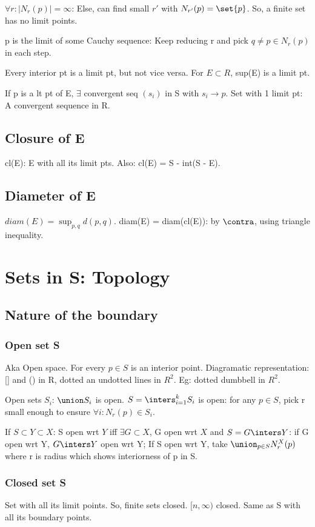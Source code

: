 \documentclass[oneside, article]{memoir}
\begin{document}
$\forall r : |N_{r}(p)| = \infty$: Else, can find small $r'$ with $N_{r'}(p) = \set{p}$. So, a finite set has no limit points.

p is the limit of some Cauchy sequence: Keep reducing r and pick $q \neq p \in N_{r}(p)$ in each step.

Every interior pt is a limit pt, but not vice versa. For $E\subset R$, sup(E) is a limit pt.

If p is a lt pt of E, $\exists$ convergent seq $(s_{i})$ in S with $s_{i} \to p$. Set with 1 limit pt: A convergent sequence in R.

\subsection{Closure of E}
cl(E): E with all its limit pts. Also: cl(E) = S - int(S - E).

\subsection{Diameter of E}
$diam(E) = \sup_{p, q} d(p, q)$. diam(E) = diam(cl(E)): by $\contra$, using triangle inequality.

\section{Sets in S: Topology}
\subsection{Nature of the boundary}
\subsubsection{Open set S}
Aka Open space. For every $p \in S$ is an interior point. Diagramatic representation: [] and () in R, dotted an undotted lines in $R^{2}$. Eg: dotted dumbbell in $R^{2}$. 

Open sets $S_{i}$: $\union S_{i}$ is open. $S = \inters_{i=1}^{k} S_{i}$ is open: for any $p\in S$, pick r small enough to ensure $\forall i: N_{r}(p) \in S_{i}$.

If $S \subset Y \subset X$: S open wrt $Y$ iff $\exists G \subset X$, G open wrt $X$ and $S = G \inters Y$: \pf if G open wrt Y, $G\inters Y$ open wrt Y; If S open wrt Y, take $\union_{p \in S} N_{r}^{X}(p)$ where r is radius which shows interiorness of p in S.

\subsubsection{Closed set S}
Set with all its limit points. So, finite sets closed. $[n, \infty )$ closed. Same as S with all its boundary points.
\end{document}
